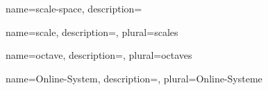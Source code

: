 {
  name={scale-space},
  description={}
}

{
  name={scale},
  description={},
  plural={scales}
}

{
  name={octave},
  description={},
  plural={octaves}
}

{
  name={Online-System},
  description={},
  plural={Online-Systeme}
}
